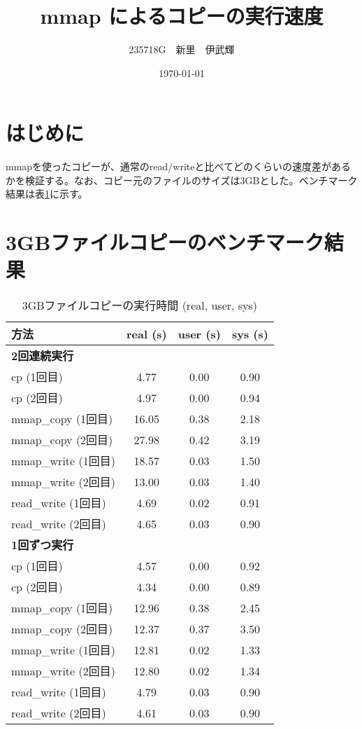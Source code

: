 \documentclass[a4paper, 11pt, titlepage]{jsarticle}
\title{mmap によるコピーの実行速度}
\author{235718G　新里　伊武輝 }
\date{\today}
\begin{document}
\maketitle

\clearpage

\section{はじめに}
mmapを使ったコピーが、通常のread/writeと比べてどのくらいの速度差があるかを検証する。なお、コピー元のファイルのサイズは3GBとした。ベンチマーク結果は表\ref{tab:benchmark}に示す。

\section{3GBファイルコピーのベンチマーク結果}

\begin{table}[h]
    \centering
    \begin{tabular}{@{}lccc@{}}
        \toprule
        \textbf{方法} & \textbf{real (s)} & \textbf{user (s)} & \textbf{sys (s)} \\
        \midrule
        \multicolumn{4}{l}{\textbf{2回連続実行}} \\
        \addlinespace
        cp (1回目) & 4.77 & 0.00 & 0.90 \\
        cp (2回目) & 4.97 & 0.00 & 0.94 \\
        mmap\_copy (1回目) & 16.05 & 0.38 & 2.18 \\
        mmap\_copy (2回目) & 27.98 & 0.42 & 3.19 \\
        mmap\_write (1回目) & 18.57 & 0.03 & 1.50 \\
        mmap\_write (2回目) & 13.00 & 0.03 & 1.40 \\
        read\_write (1回目) & 4.69 & 0.02 & 0.91 \\
        read\_write (2回目) & 4.65 & 0.03 & 0.90 \\
        \midrule
        \multicolumn{4}{l}{\textbf{1回ずつ実行}} \\
        \addlinespace
        cp (1回目) & 4.57 & 0.00 & 0.92 \\
        cp (2回目) & 4.34 & 0.00 & 0.89 \\
        mmap\_copy (1回目) & 12.96 & 0.38 & 2.45 \\
        mmap\_copy (2回目) & 12.37 & 0.37 & 3.50 \\
        mmap\_write (1回目) & 12.81 & 0.02 & 1.33 \\
        mmap\_write (2回目) & 12.80 & 0.02 & 1.34 \\
        read\_write (1回目) & 4.79 & 0.03 & 0.90 \\
        read\_write (2回目) & 4.61 & 0.03 & 0.90 \\
        \bottomrule
    \end{tabular}
    \caption{3GBファイルコピーの実行時間 (real, user, sys)}
    \label{tab:benchmark}
\end{table}
\end{document}

